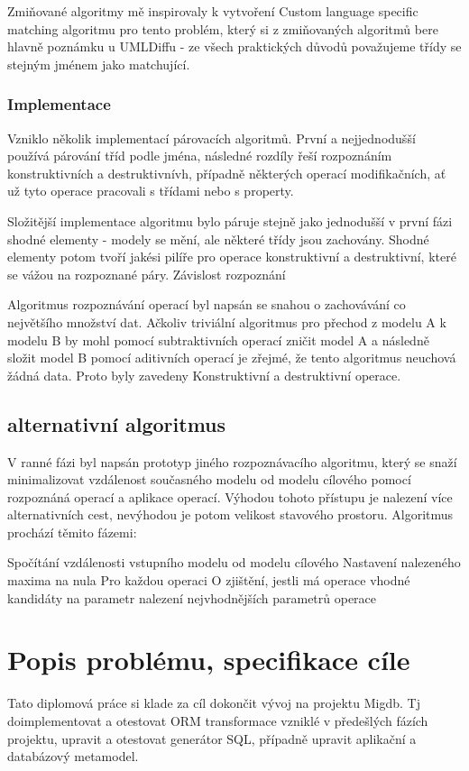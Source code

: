 \documentclass[11pt,twoside,a4paper]{book}
\begin{document}
 Zmiňované algoritmy mě inspirovaly k vytvoření Custom language specific
 matching algoritmu pro tento problém, který si z zmiňovaných algoritmů bere
 hlavně poznámku u UMLDiffu - ze všech praktických důvodů považujeme třídy se
 stejným jménem jako matchující.

 \subsection{Implementace}
 Vzniklo několik implementací párovacích algoritmů. První a nejjednodušší
 používá párování tříd podle jména, následné rozdíly řeší rozpoznáním
 konstruktivních a destruktivnívh, případně některých operací modifikačních, ať
 už tyto operace pracovali s třídami nebo s property.
 
 Složitější implementace algoritmu bylo páruje stejně jako jednodušší v
 první fázi shodné elementy - modely se mění, ale některé třídy jsou zachovány.
Shodné elementy potom tvoří jakési pilíře pro operace konstruktivní a
destruktivní, které se vážou na rozpoznané páry. Závislost rozpoznání

Algoritmus rozpoznávání operací byl napsán se snahou o zachovávání co největšího
množství dat. Ačkoliv triviální algoritmus pro přechod z modelu A k modelu B by
mohl pomocí subtraktivních operací zničit model A a následně složit model B
pomocí aditivních operací je zřejmé, že tento algoritmus neuchová žádná data.
Proto byly zavedeny Konstruktivní a destruktivní operace. 

\section{alternativní algoritmus}

V ranné fázi byl napsán prototyp jiného rozpoznávacího algoritmu, který se snaží 
minimalizovat vzdálenost současného modelu od modelu cílového pomocí rozpoznáná 
operací a aplikace operací. Výhodou tohoto přístupu je nalezení více alternativních 
cest, nevýhodou je potom velikost stavového prostoru. Algoritmus prochází těmito fázemi:

Spočítání vzdálenosti vstupního modelu od modelu cílového
Nastavení nalezeného maxima na nula
Pro každou operaci O
     zjištění, jestli má operace vhodné kandidáty na parametr
     nalezení nejvhodnějších parametrů operace



\chapter{Popis problému, specifikace cíle}
Tato diplomová práce si klade za cíl dokončit vývoj na projektu Migdb. Tj
doimplementovat a otestovat ORM transformace vzniklé v předešlých fázích
projektu, upravit a otestovat generátor SQL, případně upravit aplikační a
databázový metamodel.
\end{document}
